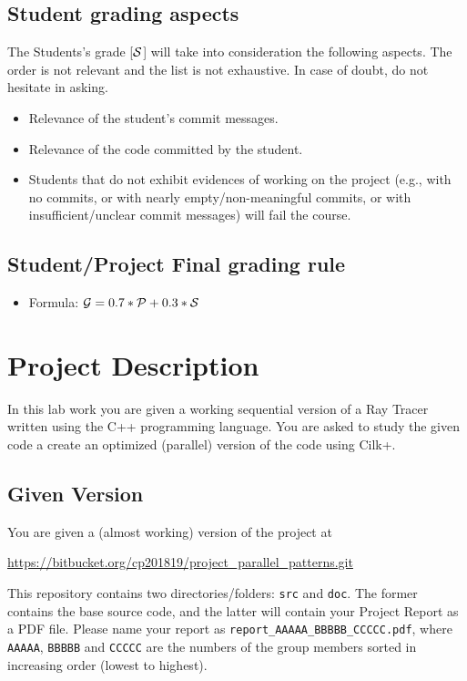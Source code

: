 \documentclass[11pt]{article}
\begin{document}
\subsection{Student grading aspects}

The Students's grade [$\cal{S}$] will take into consideration the following aspects.  The order is not relevant and the list is not exhaustive. In case of doubt, do not hesitate in asking.

\begin{itemize}
  \item Relevance of the student's commit messages.
  \item Relevance of the code committed by the student.
  \item Students that do not exhibit evidences of working on the project (e.g., with no commits, or with nearly empty/non-meaningful commits, or with insufficient/unclear commit messages) will fail the course.
\end{itemize}


\subsection{Student/Project Final grading rule}

\begin{itemize}
  \item Formula: ${\cal G} = 0.7 * {\cal P} + 0.3 * {\cal S}$
\end{itemize}


\section{Project Description}

In this lab work you are given a working sequential version of a Ray Tracer written using the C++ programming language.
You are asked to study the given code a create an optimized (parallel) version of the code using Cilk+.

\subsection{Given Version}

You are given a (almost working) version of the project at

\url{https://bitbucket.org/cp201819/project_parallel_patterns.git}


This repository contains two directories/folders: \verb!src! and \verb!doc!.  The former contains the base source code, and the latter will contain your Project Report as a PDF file.  Please name your report as \verb!report_AAAAA_BBBBB_CCCCC.pdf!, where \verb!AAAAA!,  \verb!BBBBB! and  \verb!CCCCC! are the numbers of the group members sorted in increasing order (lowest to highest).
\end{document}
